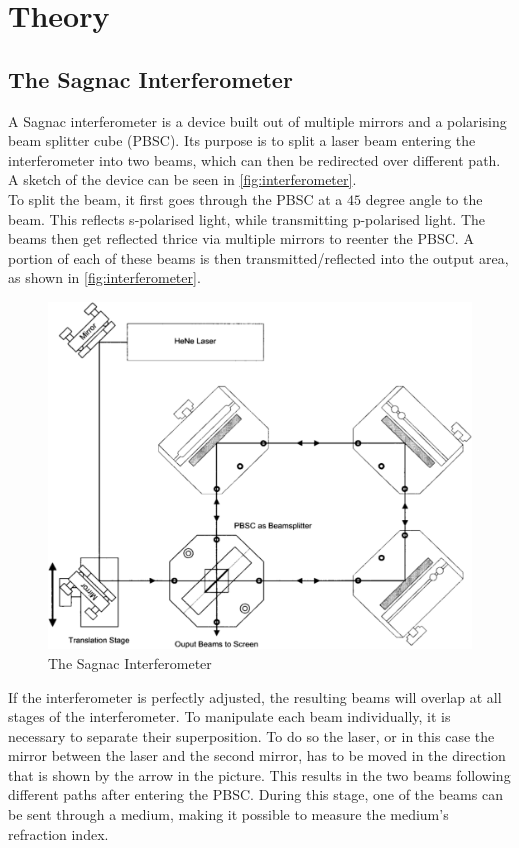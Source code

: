 \section{Theory}
\label{sec:Theory}
\subsection{The Sagnac Interferometer}
\label{sec:The_Sagnac_Interferometer}
A Sagnac interferometer is a device built out of multiple mirrors and a polarising beam splitter cube (PBSC). Its purpose is to split a laser beam entering the interferometer into two beams, which can then be redirected over different path. A sketch of the device can be seen in \autoref{fig:interferometer}.\\
To split the beam, it first goes through the PBSC at a $45$ degree angle to the beam. This reflects s-polarised light, while transmitting p-polarised light. The beams then get reflected thrice via multiple mirrors to reenter the PBSC. A portion of each of these beams is then transmitted/reflected into the output area, as shown in \autoref{fig:interferometer}.\\
\begin{figure}
\includegraphics[width=\linewidth]{./figures/aufbau.pdf}
\caption{The Sagnac Interferometer}
\label{fig:interferometer}
\end{figure}
If the interferometer is perfectly adjusted, the resulting beams will overlap at all stages of the interferometer. To manipulate each beam individually, it is necessary to separate their superposition. To do so the laser, or in this case the mirror between the laser and the second mirror, has to be moved in the direction that is shown by the arrow in the picture. This results in the two beams following different paths after entering the PBSC. During this stage, one of the beams can be sent through a medium, making it possible to measure the medium's refraction index.\\

